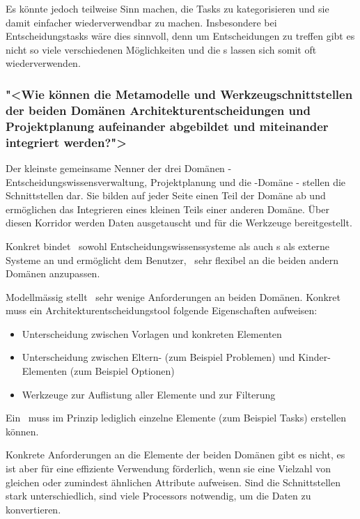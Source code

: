 			Es könnte jedoch teilweise Sinn machen, die Tasks zu kategorisieren und sie damit einfacher wiederverwendbar zu machen.
			Insbesondere bei Entscheidungstasks wäre dies sinnvoll,
			denn um Entscheidungen zu treffen gibt es nicht so viele verschiedenen Möglichkeiten
			und die \ttpl s lassen sich somit oft wiederverwenden.
			
			
		
		\subsubsection{"<Wie können die Metamodelle und Werkzeugschnittstellen der beiden Domänen Architekturentscheidungen und Projektplanung aufeinander abgebildet und miteinander integriert werden?">}
			Der kleinste gemeinsame Nenner der drei Domänen - Entscheidungswissensverwaltung, Projektplanung und die \eeppi -\-Domäne - stellen die Schnittstellen dar.
			Sie bilden auf jeder Seite einen Teil der Domäne ab und ermöglichen das Integrieren eines kleinen Teils einer anderen Domäne. 
			Über diesen Korridor werden Daten ausgetauscht und für die Werkzeuge bereitgestellt.
		
			Konkret bindet \eeppi\ sowohl Entscheidungswissenssysteme als auch \ppt s als externe Systeme an
			und ermöglicht dem Benutzer, \eeppi\ sehr flexibel an die beiden andern Domänen anzupassen.
			
			Modellmässig stellt \eeppi\ sehr wenige Anforderungen an beiden Domänen.
			Konkret muss ein Architekturentscheidungstool folgende Eigenschaften aufweisen:
			\begin{itemize}
				\item{Unterscheidung zwischen Vorlagen und konkreten Elementen}
				\item{Unterscheidung zwischen Eltern- (zum Beispiel Problemen) und Kinder-Elementen (zum Beispiel Optionen)}
				\item{Werkzeuge zur Auflistung aller Elemente und zur Filterung}
			\end{itemize}
			
			Ein \ppt\ muss im Prinzip lediglich einzelne Elemente (zum Beispiel Tasks) erstellen können.
			
			Konkrete Anforderungen an die Elemente der beiden Domänen gibt es nicht,
			es ist aber für eine effiziente Verwendung förderlich,
			wenn sie eine Vielzahl von gleichen oder zumindest ähnlichen Attribute aufweisen.
			Sind die Schnittstellen stark unterschiedlich, sind viele Processors notwendig, um die Daten zu konvertieren.
			

